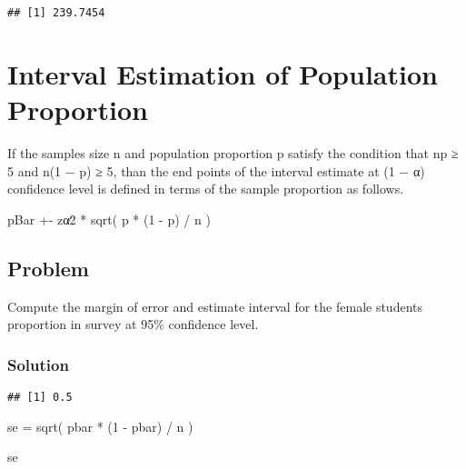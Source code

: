 \documentclass[
]{article}
\newenvironment{Shaded}{\begin{snugshade}}{\end{snugshade}}
\newcommand{\DecValTok}[1]{\textcolor[rgb]{0.00,0.00,0.81}{#1}}
\newcommand{\FunctionTok}[1]{\textcolor[rgb]{0.00,0.00,0.00}{#1}}
\newcommand{\NormalTok}[1]{#1}
\newcommand{\OtherTok}[1]{\textcolor[rgb]{0.56,0.35,0.01}{#1}}
\newcommand{\SpecialCharTok}[1]{\textcolor[rgb]{0.00,0.00,0.00}{#1}}
\newcommand{\StringTok}[1]{\textcolor[rgb]{0.31,0.60,0.02}{#1}}
\begin{document}
\begin{verbatim}
## [1] 239.7454
\end{verbatim}

\hypertarget{interval-estimation-of-population-proportion}{%
\section{Interval Estimation of Population
Proportion}\label{interval-estimation-of-population-proportion}}

If the samples size n and population proportion p satisfy the condition
that np ≥ 5 and n(1 − p) ≥ 5, than the end points of the interval
estimate at (1 − α) confidence level is defined in terms of the sample
proportion as follows.

pBar +- zα∕2 * sqrt( p * (1 - p) / n )

\hypertarget{problem-8}{%
\subsection{Problem}\label{problem-8}}

Compute the margin of error and estimate interval for the female
students proportion in survey at 95\% confidence level.

\hypertarget{solution-10}{%
\subsubsection{Solution}\label{solution-10}}

\begin{Shaded}
\end{Shaded}

\begin{verbatim}
## [1] 0.5
\end{verbatim}

\begin{Shaded}
\begin{Highlighting}[]
\NormalTok{se }\OtherTok{=} \FunctionTok{sqrt}\NormalTok{( pbar }\SpecialCharTok{*}\NormalTok{ (}\DecValTok{1} \SpecialCharTok{{-}}\NormalTok{ pbar) }\SpecialCharTok{/}\NormalTok{ n )}

\NormalTok{se}
\end{Highlighting}
\end{Shaded}
\end{document}
